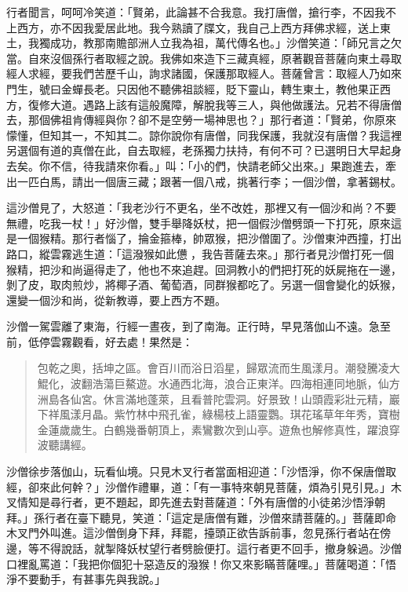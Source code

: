 行者聞言，呵呵冷笑道：「賢弟，此論甚不合我意。我打唐僧，搶行李，不因我不上西方，亦不因我愛居此地。我今熟讀了牒文，我自己上西方拜佛求經，送上東土，我獨成功，教那南贍部洲人立我為祖，萬代傳名也。」沙僧笑道：「師兄言之欠當。自來沒個孫行者取經之說。我佛如來造下三藏真經，原著觀音菩薩向東土尋取經人求經，要我們苦歷千山，詢求諸國，保護那取經人。菩薩曾言：取經人乃如來門生，號曰金蟬長老。只因他不聽佛祖談經，貶下靈山，轉生東土，教他果正西方，復修大道。遇路上該有這般魔障，解脫我等三人，與他做護法。兄若不得唐僧去，那個佛祖肯傳經與你？卻不是空勞一場神思也？」那行者道：「賢弟，你原來懞懂，但知其一，不知其二。諒你說你有唐僧，同我保護，我就沒有唐僧？我這裡另選個有道的真僧在此，自去取經，老孫獨力扶持，有何不可？已選明日大早起身去矣。你不信，待我請來你看。」叫：「小的們，快請老師父出來。」果跑進去，牽出一匹白馬，請出一個唐三藏；跟著一個八戒，挑著行李；一個沙僧，拿著錫杖。

這沙僧見了，大怒道：「我老沙行不更名，坐不改姓，那裡又有一個沙和尚？不要無禮，吃我一杖！」好沙僧，雙手舉降妖杖，把一個假沙僧劈頭一下打死，原來這是一個猴精。那行者惱了，掄金箍棒，帥眾猴，把沙僧圍了。沙僧東沖西撞，打出路口，縱雲霧逃生道：「這潑猴如此憊𪬯，我告菩薩去來。」那行者見沙僧打死一個猴精，把沙和尚逼得走了，他也不來追趕。回洞教小的們把打死的妖屍拖在一邊，剝了皮，取肉煎炒，將椰子酒、葡萄酒，同群猴都吃了。另選一個會變化的妖猴，還變一個沙和尚，從新教導，要上西方不題。

沙僧一駕雲離了東海，行經一晝夜，到了南海。正行時，早見落伽山不遠。急至前，低停雲霧觀看，好去處！果然是：
\begin{quote}
包乾之奧，括坤之區。會百川而浴日滔星，歸眾流而生風漾月。潮發騰凌大鯤化，波翻浩蕩巨鰲遊。水通西北海，浪合正東洋。四海相連同地脈，仙方洲島各仙宮。休言滿地蓬萊，且看普陀雲洞。好景致！山頭霞彩壯元精，巖下祥風漾月晶。紫竹林中飛孔雀，綠楊枝上語靈鸚。琪花瑤草年年秀，寶樹金蓮歲歲生。白鶴幾番朝頂上，素鸞數次到山亭。遊魚也解修真性，躍浪穿波聽講經。
\end{quote}

沙僧徐步落伽山，玩看仙境。只見木叉行者當面相迎道：「沙悟淨，你不保唐僧取經，卻來此何幹？」沙僧作禮畢，道：「有一事特來朝見菩薩，煩為引見引見。」木叉情知是尋行者，更不題起，即先進去對菩薩道：「外有唐僧的小徒弟沙悟淨朝拜。」孫行者在臺下聽見，笑道：「這定是唐僧有難，沙僧來請菩薩的。」菩薩即命木叉門外叫進。這沙僧倒身下拜，拜罷，擡頭正欲告訴前事，忽見孫行者站在傍邊，等不得說話，就掣降妖杖望行者劈臉便打。這行者更不回手，撤身躲過。沙僧口裡亂罵道：「我把你個犯十惡造反的潑猴！你又來影瞞菩薩哩。」菩薩喝道：「悟淨不要動手，有甚事先與我說。」

